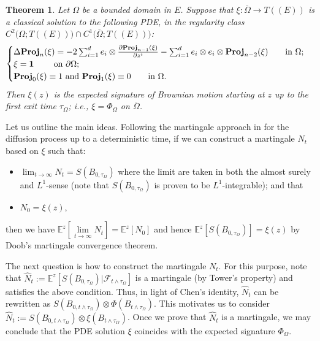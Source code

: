 \documentclass[11pt,a4paper,english,reqno]{amsart}
\theoremstyle{plain}
\newtheorem{theorem}[definition]{Theorem}
\newcommand{\p}{\partial}
\newcommand{\1}{\mathbbm{1}}
\newcommand{\proj}{\mathbf{Proj}}
\begin{document}
 
\begin{theorem}\label{thm: pde}
Let $\Omega$ be a bounded domain in $E$. Suppose that $\xi: \overline{\Omega} \rightarrow T((E))$ is a classical solution to the following PDE, in the regularity class $C^2\big(\Omega; T((E))\big)\cap C^1\big(\overline{\Omega};T((E))\big)$:
\begin{equation*}
    \begin{cases}
    \Delta \proj_{n}(\xi) = -2 \sum_{i=1}^d e_i \otimes \frac{\p  \proj_{n-1}(\xi)}{\p z^i}- \sum_{i=1}^d e_i \otimes e_i \otimes \proj_{n-2}(\xi)\qquad \text{in } \Omega;\\
   \xi = {\bf 1}  \qquad \text{ on } \p\Omega;\\
    \proj_{0}(\xi) \equiv 1  \text{ and } \proj_{1}(\xi) \equiv 0\qquad \text{in } \Omega.
    \end{cases}
\end{equation*}
Then $\xi(z)$ is the expected signature of Brownian motion starting at $z$ up to the first exit time $\tau_{\Omega}$; \emph{i.e.}, $\xi = \Phi_{\Omega}$ on $\overline{\Omega}$.
\end{theorem}


Let us outline the main ideas. Following the martingale approach in \cite{ni2012expected} for the diffusion process up to a deterministic time, if we can construct a martingale ${N}_{t}$ based on $\xi$ such that: \begin{itemize} \item[(a)] $\lim_{t\rightarrow \infty}{N}_{t} = S(B_{0, \tau_{\Omega}})$ where the limit are taken in both the almost surely and $L^{1}$-sense (note that $S(B_{0, \tau_{\Omega}})$ is proven to be $L^{1}$-integrable); and that  \item[(b)] ${N}_{0} = \xi(z)$, \end{itemize} then we have $\mathbb{E}^{z}\left[\underset{t\rightarrow \infty }{\lim}{N}_{t}\right] = \mathbb{E}^{z}[{N}_{0}] $ and hence $ \mathbb{E}^{z}[S(B_{0, \tau_{\Omega}})]= \xi(z)$ by Doob's martingale convergence theorem. 


The next question is how to construct the martingale ${N}_{t}$.  For this purpose, note that $\hat{N}_{t}:= \mathbb{E}^{z}[S(B_{0, \tau_{\Omega}}) \vert \mathcal{F}_{t\wedge \tau_{\Omega}}]$ is a martingale (by Tower's property) and satisfies the above condition. Thus, in light of Chen's identity, $\hat{N}_{t}$ can be rewritten as $ S(B_{0, t \wedge \tau_{\Omega}}) \otimes \Phi(B_{t\wedge \tau_{\Omega}})$. This motivates us to consider $\hat{N}_{t}:=S(B_{0, t \wedge \tau_{\Omega}}) \otimes \xi(B_{t\wedge \tau_{\Omega}})$. Once we prove that $\hat{N}_{t}$ is a martingale, we may conclude that the PDE solution $\xi$ coincides with the expected signature $\Phi_{\Omega}$.
\end{document}
